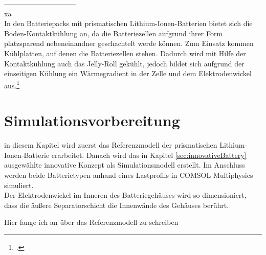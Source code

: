 \newpage
------------------------------\\
xa\\%

In den Batteriepacks mit prismatischen Lithium-Ionen-Batterien bietet sich die Boden-Kontaktkühlung an, da die Batteriezellen aufgrund ihrer Form platzsparend nebeneinandner geschachtelt werde können. Zum Einsatz kommen Kühlplatten, auf denen die Batteriezellen stehen. %
Dadurch wird mit Hilfe der Kontaktkühlung auch das Jelly-Roll gekühlt, jedoch bildet sich aufgrund der einseitigen Kühlung ein Wärmegradient in der Zelle und dem Elektrodenwickel aus.\footcite[Vgl.][S. 2107]{Inui.2007}

\newpage
\section{Simulationsvorbereitung}\label{sec:SimulationPREP}

in diesem Kapitel wird zuerst das Referenzmodell der prismatischen Lithium-Ionen-Batterie erarbeitet. Danach wird das in Kapitel \ref{sec:innovativeBattery} ausgewählte innovative Konzept als Simulationsmodell erstellt. Im Anschluss werden beide Batterietypen anhand eines Lastprofils in COMSOL Multiphysics\textsuperscript{\textregistered} simuliert.\\



Der Elektrodenwickel im Inneren des Batteriegehäuses wird so dimensioniert, dass die äußere Separatorschicht die Innenwände des Gehäuses berührt.

Hier fange ich an über das Referenzmodell zu schreiben


	